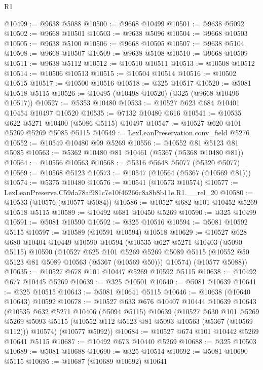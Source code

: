 \begin{lexlean}{R1}
\begin{coremodule}
@10499 := @9638 @5088
@10500 := @9668 @10499
@10501 := @9638 @5092
@10502 := @9668 @10501
@10503 := @9638 @5096
@10504 := @9668 @10503
@10505 := @9638 @5100
@10506 := @9668 @10505
@10507 := @9638 @5104
@10508 := @9668 @10507
@10509 := @9638 @5108
@10510 := @9668 @10509
@10511 := @9638 @5112
@10512 := @10510 @10511
@10513 := @10508 @10512
@10514 := @10506 @10513
@10515 := @10504 @10514
@10516 := @10502 @10515
@10517 := @10500 @10516
@10518 := @325 @10517
@10520 := @5081 @10518 @5115
@10526 := @10495 (@10498 @10520) (@325 (@9668 @10496 @10517))
@10527 := @5353 @10480
@10533 := @10527 @623 @684 @10401 @10454 @10497 @10520
@10535 := @7132 @10480 @616
@10541 := @10535 @622 @5271 @10400 (@5086 @5115) @10497
@10547 := @10527 @620 @101 @5269 @5269 @5085 @5115
@10549 := LexLeanPreservation.conv_field @5276
@10552 := @10549 @10480 @99 @5269
@10556 := @10552 @81 @5123 @81 @5085
@10563 := @5362 @10480 @81 @10461 (@5367 (@5368 @10480 @81))
@10564 := @10556 @10563
@10568 := @5316 @5648 @5077 (@5320 @5077)
@10569 := @10568 @5123
@10573 := @10547 (@10564 (@5367 (@10569 @81)))
@10574 := @5375 @10480
@10576 := @10541 (@10573 @10574)
@10577 := LexLeanPreserve.C59da78af981c7e10f46266c8a8b8b11e.R1.__rel_20
@10580 := @10533 (@10576 (@10577 @5084))
@10586 := @10527 @682 @101 @10452 @5269 @10518 @5115
@10589 := @10492 @681 @10450 @5269
@10590 := @325 @10499
@10591 := @5081 @10590
@10592 := @325 @10516
@10594 := @5081 @10592 @5115
@10597 := @10589 (@10591 @10594) @10518
@10629 := @10527
    @628
    @680
    @10404
    @10449
    @10590
    @10594
    (@10535
      @627
      @5271
      @10403
      (@5090 @5115)
      @10590
      (@10527
        @625
        @101
        @5269
        @5269
        @5089
        @5115
        (@10552 @50 @5123 @81 @5089 @10563 (@5367 (@10569 @50)))
        @10574)
      (@10577 @5088))
@10635 := @10527 @678 @101 @10447 @5269 @10592 @5115
@10638 := @10492 @677 @10445 @5269
@10639 := @325 @10501
@10640 := @5081 @10639
@10641 := @325 @10515
@10643 := @5081 @10641 @5115
@10646 := @10638 (@10640 @10643) @10592
@10678 := @10527
    @633
    @676
    @10407
    @10444
    @10639
    @10643
    (@10535
      @632
      @5271
      @10406
      (@5094 @5115)
      @10639
      (@10527
        @630
        @101
        @5269
        @5269
        @5093
        @5115
        (@10552 @112 @5123 @81 @5093 @10563 (@5367 (@10569 @112)))
        @10574)
      (@10577 @5092))
@10684 := @10527 @674 @101 @10442 @5269 @10641 @5115
@10687 := @10492 @673 @10440 @5269
@10688 := @325 @10503
@10689 := @5081 @10688
@10690 := @325 @10514
@10692 := @5081 @10690 @5115
@10695 := @10687 (@10689 @10692) @10641

\end{coremodule}
\end{lexlean}
